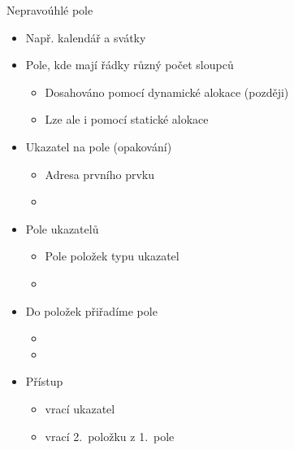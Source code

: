 \begin{frame}{Nepravoúhlé pole}

  \begin{itemize}
    \item Např.\: kalendář a svátky

    \pause

    \item Pole, kde mají řádky různý počet sloupců
    \begin{itemize}
      \item Dosahováno pomocí dynamické alokace (později)
      \item Lze ale i pomocí statické alokace
    \end{itemize}

    \pause

    \item Ukazatel na pole (opakování)
    \begin{itemize}
      \item Adresa prvního prvku
      \item {}
    \end{itemize}

    \pause

    \item Pole ukazatelů
    \begin{itemize}
      \item Pole položek typu ukazatel
      \item {}
    \end{itemize}

    \pause

    \item Do položek  přiřadíme pole
    \begin{itemize}
      \item {}
      \item {}
    \end{itemize}

    \pause

    \item Přístup
    \begin{itemize}
      \item {} vrací ukazatel
      \item {} vrací 2.\ položku z 1.\ pole
    \end{itemize}

  \end{itemize}

\end{frame}

